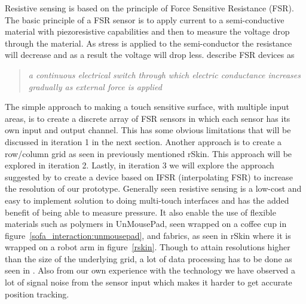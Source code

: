 Resistive sensing is based on the principle of Force Sensitive Resistance (FSR).
The basic principle of a FSR sensor is to apply current to a semi-conductive material with piezoresistive capabilities and then to measure the voltage drop through the material.
As stress is applied to the semi-conductor the resistance will decrease and as a result the voltage will drop less. 
\citet{rosenberg2009unmousepad} describe FSR devices as 
\begin{quotation}
\emph{a continuous electrical switch through which electric conductance increases gradually as external force is applied}
\end{quotation}
The simple approach to making a touch sensitive surface, with multiple input areas, is to create a discrete array of FSR sensors in which each sensor has its own input and output channel.
This has some obvious limitations that will be discussed in iteration 1 in the next section.
Another approach is to create a row/column grid as seen in previously mentioned rSkin.
This approach will be explored in iteration 2.
Lastly, in iteration 3 we will explore the approach suggested by \citet{rosenberg2009unmousepad} to create a device based on IFSR (interpolating FSR) to increase the resolution of our prototype.
Generally seen resistive sensing is a low-cost and easy to implement solution to doing multi-touch interfaces and has the added benefit of being able to measure pressure.
It also enable the use of flexible materials such as polymers in UnMousePad, seen wrapped on a coffee cup in figure~\ref{sofa_interaction:unmousepad}, and fabrics, as seen in rSkin where it is wrapped on a robot arm in figure~\ref{rskin}.
Though to attain resolutions higher than the size of the underlying grid, a lot of data processing has to be done as seen in \citep{rosenberg2009unmousepad}.
Also from our own experience with the technology we have observed a lot of signal noise from the sensor input which makes it harder to get accurate position tracking.   

